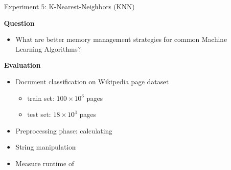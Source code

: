 \documentclass[9pt]{beamer}
\begin{document}
\begin{frame}[fragile]{Experiment 5: K-Nearest-Neighbors (KNN)}

    \textbf{Question}
    \begin{itemize}
        \item What are better memory management strategies for common Machine Learning Algorithms?
    \end{itemize}

    \vspace{0.5cm}

    \textbf{Evaluation}
    \begin{itemize}
        \item Document classification on Wikipedia page dataset
        \begin{itemize}
            \item train set: \(100 \times 10^3 \) pages
            \item test set: \(18 \times  10^3\) pages
        \end{itemize}
        \item Preprocessing phase: calculating 
        \item String manipulation
        \item Measure runtime of 
    \end{itemize}
\end{frame}

\end{document}
